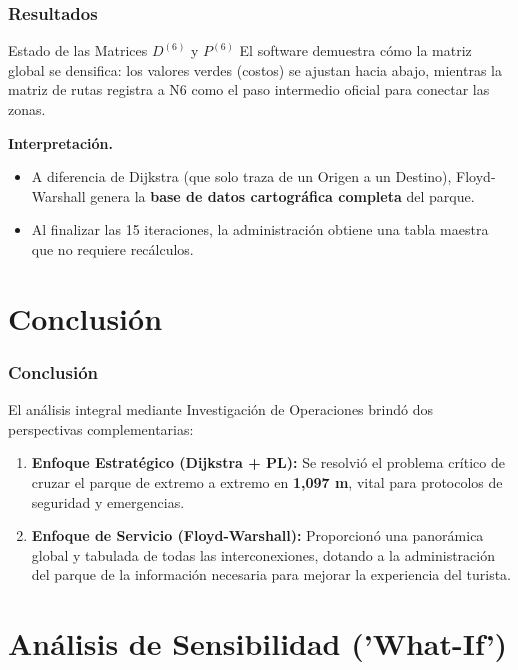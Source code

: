 \documentclass[aspectratio=169]{beamer}
\begin{document}
\begin{frame}
    \frametitle{Resultados}
    \begin{block}{Estado de las Matrices $D^{(6)}$ y $P^{(6)}$}
        El software demuestra cómo la matriz global se densifica: los valores verdes (costos) se ajustan hacia abajo, mientras la matriz de rutas registra a N6 como el paso intermedio oficial para conectar las zonas.
    \end{block}
    
    \vspace{0.3cm}
    \textbf{Interpretación.}
    \begin{itemize}
        \item A diferencia de Dijkstra (que solo traza de un Origen a un Destino), Floyd-Warshall genera la \textbf{base de datos cartográfica completa} del parque.
        \item Al finalizar las 15 iteraciones, la administración obtiene una tabla maestra que no requiere recálculos. 
    \end{itemize}
\end{frame}

\section{Conclusión}

\begin{frame}
    \frametitle{Conclusión}
    El análisis integral mediante Investigación de Operaciones brindó dos perspectivas complementarias:
    \vspace{0.4cm}
    \begin{enumerate}
        \item \textbf{Enfoque Estratégico (Dijkstra + PL):} Se resolvió el problema crítico de cruzar el parque de extremo a extremo en \textbf{1,097 m}, vital para protocolos de seguridad y emergencias.
        \vspace{0.2cm}
        \item \textbf{Enfoque de Servicio (Floyd-Warshall):} Proporcionó una panorámica global y tabulada de todas las interconexiones, dotando a la administración del parque de la información necesaria para mejorar la experiencia del turista.
    \end{enumerate}
    \vspace{0.4cm}
\end{frame}


\section{Análisis de Sensibilidad ('What-If')}
\end{document}
